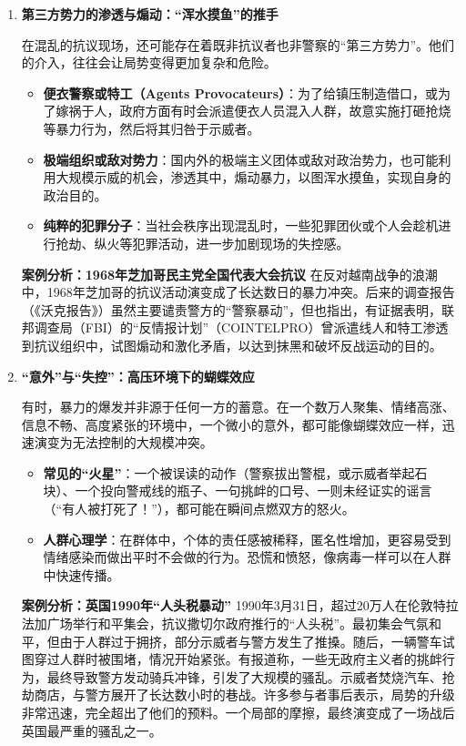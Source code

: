 \begin{enumerate}
    \item \textbf{第三方势力的渗透与煽动：“浑水摸鱼”的推手}

    在混乱的抗议现场，还可能存在着既非抗议者也非警察的“第三方势力”。他们的介入，往往会让局势变得更加复杂和危险。
    \begin{itemize}
        \item \textbf{便衣警察或特工（Agents Provocateurs）}：为了给镇压制造借口，或为了嫁祸于人，政府方面有时会派遣便衣人员混入人群，故意实施打砸抢烧等暴力行为，然后将其归咎于示威者。
        \item \textbf{极端组织或敌对势力}：国内外的极端主义团体或敌对政治势力，也可能利用大规模示威的机会，渗透其中，煽动暴力，以图浑水摸鱼，实现自身的政治目的。
        \item \textbf{纯粹的犯罪分子}：当社会秩序出现混乱时，一些犯罪团伙或个人会趁机进行抢劫、纵火等犯罪活动，进一步加剧现场的失控感。
    \end{itemize}

    \textbf{案例分析：1968年芝加哥民主党全国代表大会抗议}
    在反对越南战争的浪潮中，1968年芝加哥的抗议活动演变成了长达数日的暴力冲突。后来的调查报告（《沃克报告》）虽然主要谴责警方的“警察暴动”，但也指出，有证据表明，联邦调查局（FBI）的“反情报计划”（COINTELPRO）曾派遣线人和特工渗透到抗议组织中，试图煽动和激化矛盾，以达到抹黑和破坏反战运动的目的。

    \item \textbf{“意外”与“失控”：高压环境下的蝴蝶效应}

    有时，暴力的爆发并非源于任何一方的蓄意。在一个数万人聚集、情绪高涨、信息不畅、高度紧张的环境中，一个微小的意外，都可能像蝴蝶效应一样，迅速演变为无法控制的大规模冲突。
    \begin{itemize}
        \item \textbf{常见的“火星”}：一个被误读的动作（警察拔出警棍，或示威者举起石块）、一个投向警戒线的瓶子、一句挑衅的口号、一则未经证实的谣言（“有人被打死了！”），都可能在瞬间点燃双方的怒火。
        \item \textbf{人群心理学}：在群体中，个体的责任感被稀释，匿名性增加，更容易受到情绪感染而做出平时不会做的行为。恐慌和愤怒，像病毒一样可以在人群中快速传播。
    \end{itemize}

    \textbf{案例分析：英国1990年“人头税暴动”}
    1990年3月31日，超过20万人在伦敦特拉法加广场举行和平集会，抗议撒切尔政府推行的“人头税”。最初集会气氛和平，但由于人群过于拥挤，部分示威者与警方发生了推搡。随后，一辆警车试图穿过人群时被围堵，情况开始紧张。有报道称，一些无政府主义者的挑衅行为，最终导致警方发动骑兵冲锋，引发了大规模的骚乱。示威者焚烧汽车、抢劫商店，与警方展开了长达数小时的巷战。许多参与者事后表示，局势的升级非常迅速，完全超出了他们的预料。一个局部的摩擦，最终演变成了一场战后英国最严重的骚乱之一。


\end{enumerate}
